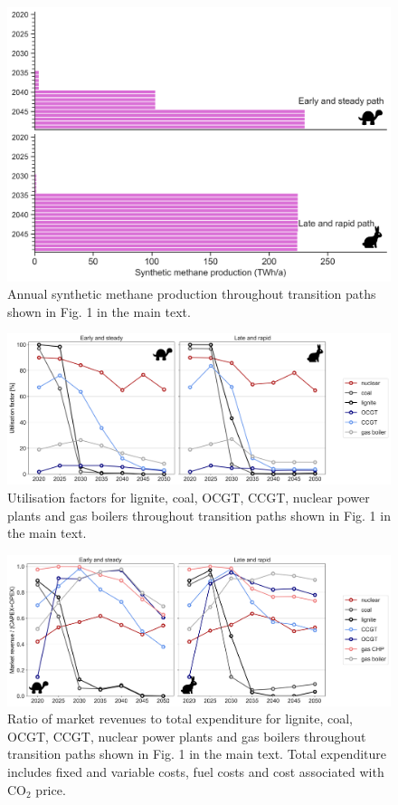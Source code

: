 \documentclass[3p]{elsarticle} %
\begin{document}
\begin{figure}[!h]
\centering
\includegraphics[width=0.7\columnwidth]{../figures/methanation_expansion_Base.png}
\caption{Annual synthetic methane production throughout transition paths shown in Fig. 1 in the main text.} \label{fig_synthetic_methane} 
\end{figure}
\clearpage


\begin{figure}[!h]
\centering
\includegraphics[width=\columnwidth]{../figures/utilisation_factors_Base.png}
\caption{Utilisation factors for lignite, coal, OCGT, CCGT, nuclear power plants and gas boilers throughout transition paths shown in Fig. 1 in the main text.} \label{fig_utilisation_factors} 
\end{figure}
\clearpage

\begin{figure}[!h]
\centering
\includegraphics[width=\columnwidth]{../figures/revenue_vs_expenditure_Base.png}
\caption{Ratio of market revenues to total expenditure for lignite, coal, OCGT, CCGT, nuclear power plants and gas boilers throughout transition paths shown in Fig. 1 in the main text. Total expenditure includes fixed and variable costs, fuel costs and cost associated with CO$_2$ price. } \label{fig_revenues_vs_expenditure} 
\end{figure}
\clearpage
\end{document}

